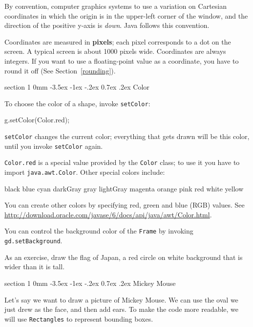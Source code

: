 \documentclass{book}
\makeatletter
\renewcommand{\section}{\@startsection 
    {section} {1} {0mm}%
    {-3.5ex \@plus -1ex \@minus -.2ex}%
    {0.7ex \@plus.2ex}%
    {\normalfont\Large\bfseries}}
\makeatother
\begin{document}


By convention, computer graphics systems to use a
variation on Cartesian coordinates in which the origin is in the
upper-left corner of the window, and the direction of the
positive y-axis is {\em down}.  Java follows this convention.


Coordinates are measured in {\bf pixels}; each pixel corresponds to
a dot on the screen.  A typical screen is about
1000 pixels wide.  Coordinates are always integers.  If you want to
use a floating-point value as a coordinate, you have to round it off
(See Section~\ref{rounding}).


\section{Color}

To choose the color of a shape, invoke {\tt setColor}:

\begin{verbatimtab}
    g.setColor(Color.red);
\end{verbatimtab}
%
{\tt setColor} changes the current color; everything that gets drawn 
will be this color, until you invoke {\tt setColor} again.

{\tt Color.red} is a special value provided by the {\tt Color}
class; to use it you have to import {\tt java.awt.Color}.
Other special colors include:

\begin{verbatimtab}
black     blue    cyan   darkGray   gray   lightGray
magenta	  orange  pink   red        white  yellow
\end{verbatimtab}
%
You can create other colors by specifying red, green and blue (RGB)
values.  See \url{http://download.oracle.com/javase/6/docs/api/java/awt/Color.html}.

You can control the background color of the {\tt Frame} by
invoking {\tt gd.setBackground}.

As an exercise, draw the flag of Japan, a red circle on white background
that is wider than it is tall.


\section{Mickey Mouse}

Let's say we want to draw a picture of Mickey Mouse.  We can use the
oval we just drew as the face, and then add ears.  To make the code
more readable, we will use {\tt Rectangles} to represent bounding boxes.
\end{document}

